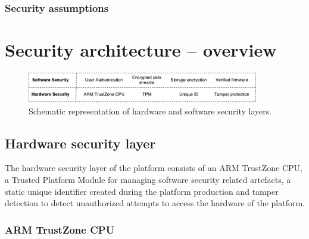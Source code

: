 \documentclass[10pt]{article}
\begin{document}
      \subsubsection{Security assumptions}

         \begin{itemize}
         \end{itemize}

  \section{Security architecture -- overview}

    \begin{figure}[H]
      \center
      \includegraphics[width=0.9\textwidth]{input/security_layers.pdf}
      \caption{Schematic representation of hardware and software security layers.}
    \end{figure}

    \subsection{Hardware security layer}

      The hardware security layer of the platform consists of an ARM TrustZone
      CPU, a Trusted Platform Module for managing software security related
      artefacts, a static unique identifier created during the platform
      production and tamper detection to detect unauthorized attempts to
      access the hardware of the platform.

      \subsubsection{ARM TrustZone CPU}
\end{document}
